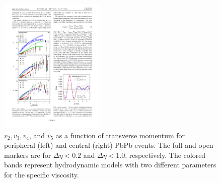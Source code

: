   \begin{figure}[htpb]
    \centering
    \includegraphics[width=0.45\textwidth]{Introduction/flow_measurements_central.pdf}
    \caption{$v_2, v_3, v_4$, and  $v_5$ as a function of transverse momentum for peripheral (left) and central (right) PbPb events. The full and open markers are for  $\Delta\eta < 0.2$ and  $\Delta\eta < 1.0$, respectively. The colored bands represent hydrodynamic models with two different parameters for the specific viscosity.}
    \label{fig:flow_measurements}
  \end{figure}


